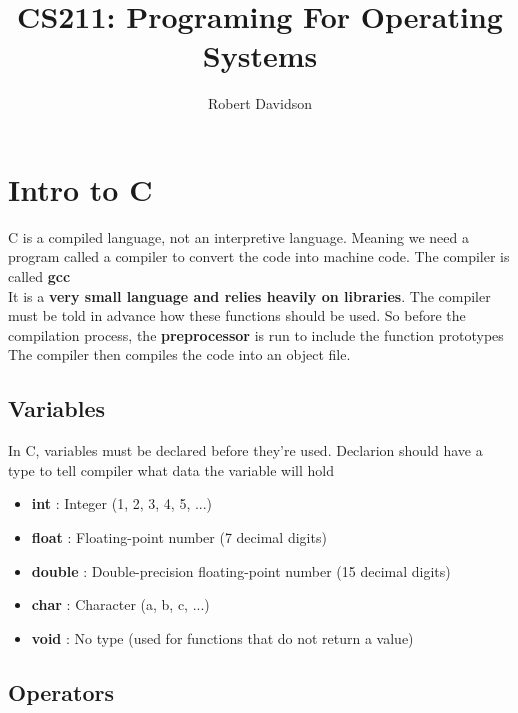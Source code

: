 \documentclass[a4paper, 10pt]{article}
\title{
\textbf{CS211: Programing For Operating Systems} \\ 
}
\author{
Robert Davidson
}
\date{}
\begin{document}
\maketitle
\pagebreak

\tableofcontents
\pagebreak

\section{Intro to C}
C is a compiled language, not an interpretive language. Meaning we need a program called a compiler to convert the code into machine code. The compiler is called \textbf{gcc} \\[2ex]
It is a \textbf{very small language and relies heavily on libraries}. The compiler must be told in advance how these functions should be used. So before the compilation process, the \textbf{preprocessor} is run to include the function prototypes The compiler then compiles the code into an object file.

\subsection{Variables}
In C, variables must be declared before they're used. Declarion should have a type to tell compiler what data the variable will hold
\begin{itemize}
    \item \textbf{int} : Integer (1, 2, 3, 4, 5, ...)
    \item \textbf{float} : Floating-point number (7 decimal digits)
    \item \textbf{double} : Double-precision floating-point number (15 decimal digits)
    \item \textbf{char} : Character (a, b, c, ...)
    \item \textbf{void} : No type  (used for functions that do not return a value)
\end{itemize}

\subsection{Operators}
\end{document}
